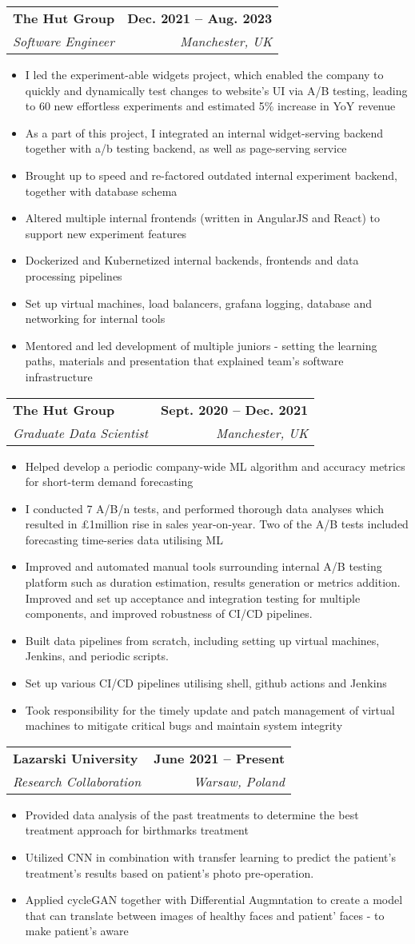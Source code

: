 \documentclass[letterpaper,11pt]{article}
\makeatletter
\newcommand{\resumeItem}[1]{
  \item\small{
    {#1 \vspace{-2pt}}
  }
}
\newcommand{\resumeSubheading}[4]{
  \vspace{-2pt}\item
    \begin{tabular*}{1.0\textwidth}[t]{l@{\extracolsep{\fill}}r}
      \textbf{#1} & \textbf{\small #2} \\
      \textit{\small#3} & \textit{\small #4} \\
    \end{tabular*}\vspace{-7pt}
}
\newcommand{\resumeItemListStart}{\begin{itemize}}
\newcommand{\resumeItemListEnd}{\end{itemize}\vspace{-5pt}}
\makeatother
\begin{document}
    \resumeSubheading
      {The Hut Group}{Dec. 2021 -- Aug. 2023}
      {Software Engineer}{Manchester, UK}
      \resumeItemListStart
        \resumeItem{I led the experiment-able widgets project, which enabled the company to quickly and dynamically test changes to website's UI via A/B testing, leading to 60 new effortless experiments and estimated 5\% increase in YoY revenue}
        \resumeItem{As a part of this project, I integrated an internal widget-serving backend together with a/b testing backend, as well as page-serving service}
        \resumeItem{Brought up to speed and re-factored outdated internal experiment backend, together with database schema}
        \resumeItem{Altered multiple internal frontends (written in AngularJS and React) to support new experiment features}
        \resumeItem{Dockerized and Kubernetized internal backends, frontends and data processing pipelines}
        \resumeItem{Set up virtual machines, load balancers, grafana logging, database and networking for internal tools}
        \resumeItem{Mentored and led development of multiple juniors - setting the learning paths, materials and presentation that explained team's software infrastructure}
      \resumeItemListEnd

    \resumeSubheading
      {The Hut Group}{Sept. 2020 -- Dec. 2021}
      {Graduate Data Scientist}{Manchester, UK}
      \resumeItemListStart
        \resumeItem{Helped develop a periodic company-wide ML algorithm and accuracy metrics for short-term demand forecasting}
        \resumeItem{I conducted 7 A/B/n tests, and performed thorough data analyses which resulted in £1million rise in sales year-on-year. Two of the A/B tests included forecasting time-series data utilising ML}
        \resumeItem{Improved and automated manual tools surrounding internal A/B testing platform such as duration estimation, results generation or metrics addition. Improved and set up acceptance and integration testing for multiple components, and improved robustness of CI/CD pipelines.}
        \resumeItem{Built data pipelines from scratch, including setting up virtual machines, Jenkins, and periodic scripts.}
        \resumeItem{Set up various CI/CD pipelines utilising shell, github actions and Jenkins}   
        \resumeItem{Took responsibility for the timely update and patch management of virtual machines to mitigate critical bugs and maintain system integrity}
      \resumeItemListEnd


      \resumeSubheading
      {Lazarski University}{June 2021 -- Present}
      {Research Collaboration}{Warsaw, Poland}
      \resumeItemListStart
        \resumeItem{Provided data analysis of the past treatments to determine the best treatment approach for birthmarks treatment}
        \resumeItem{Utilized CNN in combination with transfer learning to predict the patient's treatment's results based on patient's photo pre-operation.}
        \resumeItem{Applied cycleGAN together with Differential Augmntation to create a model that can translate between images of healthy faces and patient' faces - to make patient's aware}
      \resumeItemListEnd
\end{document}
